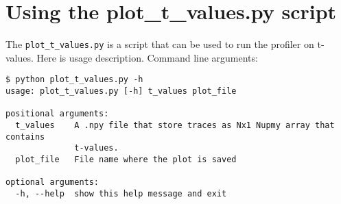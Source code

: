 \section{Using the plot\_t\_values.py script}

The \texttt{plot\_t\_values.py} is a script that can be used to run the profiler on t-values. Here is usage description.\newline
Command line arguments: \newline

\begin{verbatim}
$ python plot_t_values.py -h
usage: plot_t_values.py [-h] t_values plot_file

positional arguments:
  t_values    A .npy file that store traces as Nx1 Nupmy array that contains
              t-values.
  plot_file   File name where the plot is saved

optional arguments:
  -h, --help  show this help message and exit
\end{verbatim}
  

